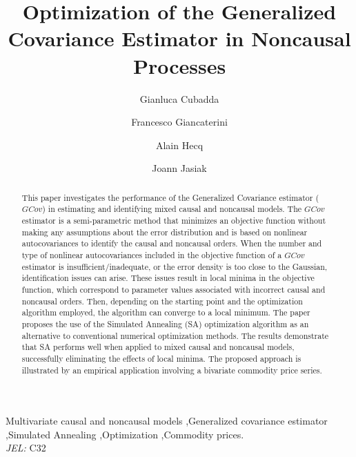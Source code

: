 \documentclass[<1p>]{elsarticle} %
\let\today\relax
\begin{document}
\begin{frontmatter}
\begin{abstract}
This paper investigates the performance of the Generalized Covariance estimator ($GCov$) in estimating and identifying mixed causal and noncausal models. The $GCov$ estimator is a semi-parametric method that minimizes an objective function without making any assumptions about the error distribution and is based on nonlinear autocovariances to identify the causal and noncausal orders. When the number and type of nonlinear autocovariances included in the objective function of a $GCov$ estimator is insufficient/inadequate,  or the error density is too close to the Gaussian, identification issues can arise. These issues result in local minima in the objective function, which correspond to parameter values associated with incorrect causal and noncausal orders. Then, depending on the starting point and the optimization algorithm employed, the algorithm can converge to a local minimum. The paper proposes the use of the Simulated Annealing (SA) optimization algorithm as an alternative to conventional numerical optimization methods. The results demonstrate that SA performs well when applied to mixed causal and noncausal models, successfully eliminating the effects of local minima. The proposed approach is illustrated by an empirical application involving a bivariate commodity price series.
\end{abstract}
\begin{keyword}
Multivariate causal and noncausal models \sep Generalized covariance estimator \sep Simulated Annealing
\sep Optimization \sep Commodity prices.\\
\emph{JEL:} C32
\end{keyword}
\title{Optimization of the Generalized Covariance Estimator in Noncausal Processes}
\date{\today}
\author[a]{Gianluca Cubadda}
\author[a]{Francesco Giancaterini}
\author[b]{Alain Hecq}
\author[c]{Joann Jasiak}
\address[a]{Università di Roma ”Tor Vergata”, Italy}
\address[b]{Maastricht University, The Netherlands}
\address[c]{York University, Canada}
\renewcommand{\thefootnote}{\textdagger} %
\end{frontmatter}
\end{document}
